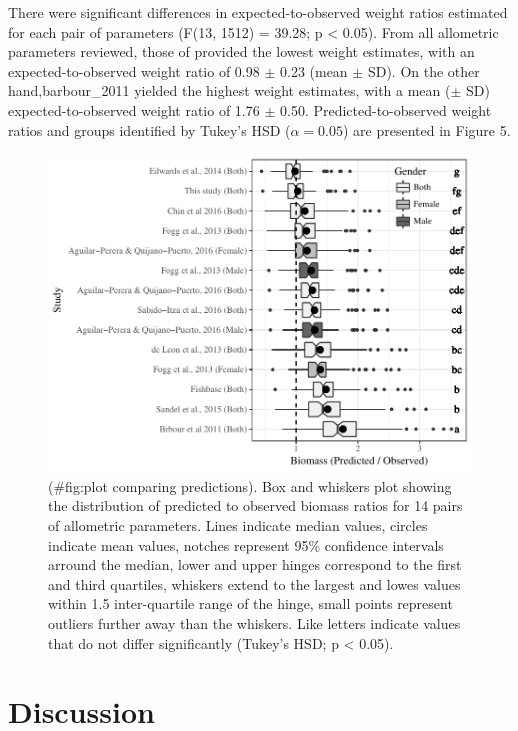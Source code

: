 \documentclass[fleqn,10pt,lineno]{wlpeerj} %
\theoremstyle{definition}
\theoremstyle{definition}
\theoremstyle{definition}
\theoremstyle{remark}
\begin{document}
There were significant differences in expected-to-observed weight ratios
estimated for each pair of parameters (F(13, 1512) = 39.28; p
\textless{} 0.05). From all allometric parameters reviewed, those of
\citet{edwards_2014} provided the lowest weight estimates, with an
expected-to-observed weight ratio of 0.98 \(\pm\) 0.23 (mean \(\pm\)
SD). On the other hand,barbour\_2011 yielded the highest weight
estimates, with a mean (\(\pm\) SD) expected-to-observed weight ratio of
1.76 \(\pm\) 0.50. Predicted-to-observed weight ratios and groups
identified by Tukey's HSD (\(\alpha = 0.05\)) are presented in Figure 5.

\begin{figure}
\centering
\includegraphics{Manuscript_files/figure-latex/plot comparing predictions-1.pdf}
\caption{(\#fig:plot comparing predictions). Box and whiskers plot
showing the distribution of predicted to observed biomass ratios for 14
pairs of allometric parameters. Lines indicate median values, circles
indicate mean values, notches represent 95\% confidence intervals
arround the median, lower and upper hinges correspond to the first and
third quartiles, whiskers extend to the largest and lowes values within
1.5 inter-quartile range of the hinge, small points represent outliers
further away than the whiskers. Like letters indicate values that do not
differ significantly (Tukey's HSD; p \textless{} 0.05).}
\end{figure}

\section{Discussion}\label{discussion}
\end{document}

